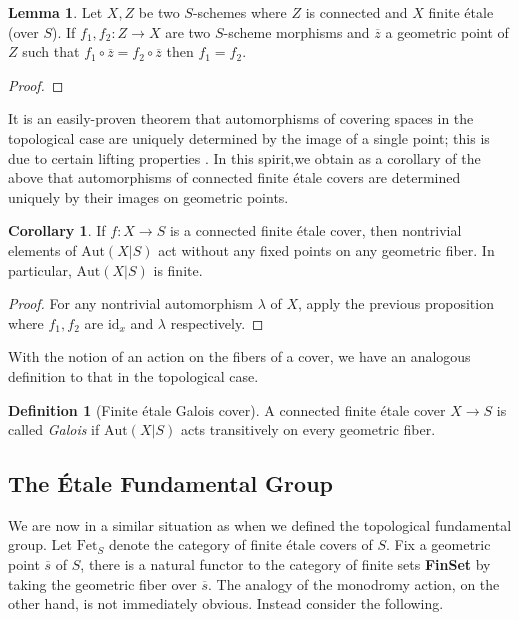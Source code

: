 \documentclass{article}
\theoremstyle{definition}
\newtheorem{lemma}[theorem]{Lemma}
\newtheorem{corollary}[theorem]{Corollary}
\newtheorem{definition}[theorem]{Definition}
\theoremstyle{remark}
\begin{document}
\begin{lemma}
	Let $X, Z$ be two $S$-schemes where $Z$ is connected and $X$ finite \'etale (over $S$). 
	If $f_1, f_2: Z \to X$ are two $S$-scheme morphisms and $\overline{z}$ a geometric point of $Z$  such that $f_1 \circ \overline{z} = f_2 \circ \overline{z}$ then $f_1 = f_2$.
\end{lemma}

\begin{proof}
\end{proof}

It is an easily-proven theorem that automorphisms of covering spaces in the topological case are uniquely determined by the image of a single point; this is due to certain lifting properties .
In this spirit,we obtain as a corollary of the above that automorphisms of connected finite \'etale covers are determined uniquely by their images on geometric points.
\begin{corollary}
	If $f: X \to S$ is a connected finite \'etale cover, then nontrivial elements of $\text{Aut}(X|S)$ act without any fixed points on any geometric fiber.
	In particular, $\text{Aut}(X|S)$ is finite.
\end{corollary}

\begin{proof}
	For any nontrivial automorphism $\lambda$ of $X$, apply the previous proposition where $f_1, f_2$ are $\text{id}_x$ and $\lambda$ respectively.
\end{proof}

With the notion of an action on the fibers of a cover, we have an analogous definition to that in the topological case.

\begin{definition}[Finite \'etale Galois cover]
	A connected finite \'etale cover $X \to S$ is called \textit{Galois} if $\text{Aut}(X|S)$ acts transitively on every geometric fiber.
\end{definition}


\subsection{The \'Etale Fundamental Group}


We are now in a similar situation as when we defined the topological fundamental group.
Let $\text{Fet}_S$ denote the category of finite \'etale covers of $S$.
Fix a geometric point $\overline{s}$ of $S$, there is a natural functor to the category of finite sets \textbf{FinSet} by taking the geometric fiber over $\overline{s}$. 
The analogy of the monodromy action, on the other hand, is not immediately obvious.
Instead consider the following.
\end{document}
